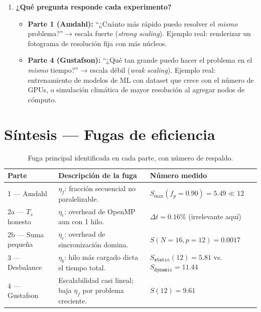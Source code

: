 \documentclass[12pt,letterpaper]{article}
\begin{document}
\begin{enumerate}
\item \textbf{¿Qué pregunta responde cada experimento?}
\begin{itemize}
  \item \textbf{Parte 1 (Amdahl):} ``¿Cuánto más rápido puedo resolver el \emph{mismo} problema?'' → escala fuerte (\textit{strong scaling}). Ejemplo real: renderizar un fotograma de resolución fija con más núcleos.
  \item \textbf{Parte 4 (Gustafson):} ``¿Qué tan grande puedo hacer el problema en el \emph{mismo} tiempo?'' → escala débil (\textit{weak scaling}). Ejemplo real: entrenamiento de modelos de ML con dataset que crece con el número de GPUs, o simulación climática de mayor resolución al agregar nodos de cómputo.
\end{itemize}

\end{enumerate}

\section{Síntesis — Fugas de eficiencia}

\begin{table}[H]
\centering
\caption{Fuga principal identificada en cada parte, con número de respaldo.}
\begin{tabularx}{\textwidth}{lXl}
\toprule
\textbf{Parte} & \textbf{Descripción de la fuga} & \textbf{Número medido} \\
\midrule
1 — Amdahl & $\eta_f$: fracción secuencial no paralelizable. & $S_{\max}(f_p{=}0.90) = 5.49 \ll 12$ \\
2a — $T_s$ honesto & $\eta_c$: overhead de OpenMP aun con 1 hilo. & $\Delta t = 0.16\%$ (irrelevante aquí) \\
2b — Suma pequeña & $\eta_c$: overhead de sincronización domina. & $S(N{=}16,p{=}12) = 0.0017$ \\
3 — Desbalance & $\eta_b$: hilo más cargado dicta el tiempo total. & $S_{\texttt{static}}(12) = 5.81$ vs.\ $S_{\texttt{dynamic}} = 11.44$ \\
4 — Gustafson & Escalabilidad casi lineal; baja $\eta_f$ por problema creciente. & $S(12) = 9.61$ \\
\bottomrule
\end{tabularx}
\end{table}
\end{document}
